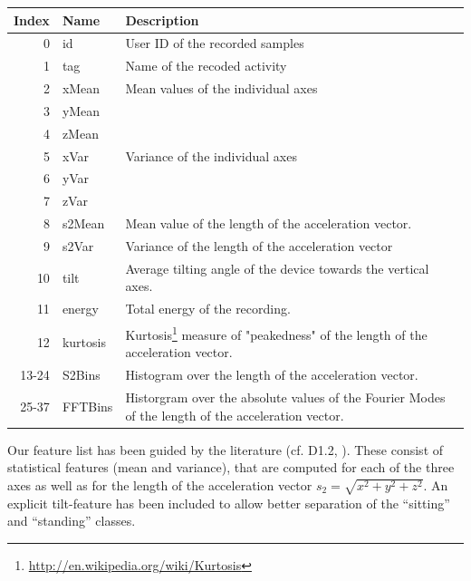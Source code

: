 \begin{center}
\begin{tabular}{|r|l|p{11.5cm}|} \hline
Index & Name     & Description \\ \hline
0            & id       & User ID of the recorded samples \\ \hline
1            & tag      & Name of the recoded activity    \\ \hline
2            & xMean    & Mean values of the individual axes \\ 
3            & yMean    &             \\ 
4            & zMean    &             \\ \hline
5            & xVar     & Variance of the individual axes  \\ 
6            & yVar     &             \\ 
7            & zVar     &             \\ \hline
8            & s2Mean   & Mean value of the length of the acceleration
                          vector. \\ \hline
9            & s2Var    & Variance of the length of the acceleration
                          vector \\ \hline
10           & tilt     & Average tilting angle of the device towards
                          the vertical axes. \\ \hline
11           & energy   & Total energy of the recording.  \\ \hline
12           & kurtosis & Kurtosis\footnote{\url{http://en.wikipedia.org/wiki/Kurtosis}} 
                          measure of "peakedness" of the length of 
                          the acceleration vector. \\ \hline
13-24        & S2Bins   & Histogram over the length of the
                          acceleration vector. \\ \hline
25-37        & FFTBins  & Historgram over the absolute values of the
                          Fourier Modes of the length of the
                          acceleration vector. \\ \hline
\end{tabular}
\end{center}

Our feature list has been guided by the literature (cf. D1.2,
\cite{lara12}).  These consist of statistical features (mean and
variance), that are computed for each of the three axes as well as for
the length of the acceleration vector $s_2 = \sqrt{x^2 + y^2 + z^2}$.
An explicit tilt-feature has been included to allow better separation
of the ``sitting'' and ``standing'' classes.

